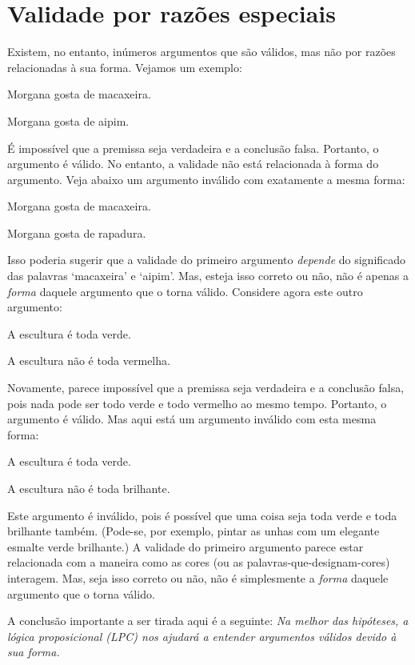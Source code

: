 \section{Validade por razões especiais}
Existem, no entanto, inúmeros argumentos que são válidos, mas não por razões relacionadas à sua forma. Vejamos um exemplo:
	\begin{earg}
		\item[] Morgana gosta de macaxeira.
		\item[\therefore] Morgana gosta de aipim.
	\end{earg}
É impossível que a premissa seja verdadeira e a conclusão falsa.
Portanto, o argumento é válido.
No entanto, a validade não está relacionada à forma do argumento.
Veja abaixo um argumento inválido com exatamente a mesma forma:
	\begin{earg}
		\item[] Morgana gosta de macaxeira.
		\item[\therefore] Morgana gosta de rapadura.
	\end{earg}
Isso poderia sugerir que a validade do primeiro argumento \emph{depende} do significado das palavras `macaxeira' e `aipim'.
Mas, esteja isso correto ou não, não é apenas a \emph{forma} daquele argumento que o torna válido.
Considere agora este outro argumento:
	\begin{earg}
		\item[] A escultura é toda verde.
		\item[\therefore] A escultura não é toda vermelha. 
	\end{earg}
Novamente, parece impossível que a premissa seja verdadeira e a conclusão falsa, pois nada pode ser todo verde e todo vermelho ao mesmo tempo.
Portanto, o argumento é válido.
Mas aqui está um argumento inválido com esta mesma forma:
	\begin{earg}
		\item[] A escultura é toda verde.
		\item[\therefore] A escultura não é toda brilhante.
	\end{earg}
Este argumento é inválido, pois é possível que uma coisa seja toda verde e toda brilhante também.
(Pode-se, por exemplo, pintar as unhas com um elegante esmalte verde brilhante.)
A validade do primeiro argumento parece estar relacionada com a maneira como as cores (ou as palavras-que-designam-cores) interagem.
Mas, seja isso correto ou não, não é simplesmente a \emph{forma} daquele argumento que o torna válido.

A conclusão importante a ser tirada aqui é a seguinte:
\emph{Na melhor das hipóteses, a lógica proposicional (LPC) nos ajudará a entender argumentos válidos devido à sua forma.}


